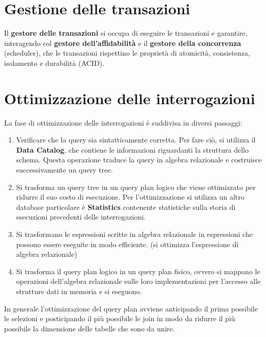 \section{Gestione delle transazioni}
Il \textbf{gestore delle transazioni} si occupa di eseguire le transazioni e
garantire, interagendo col \textbf{gestore dell'affidabilità} e il \textbf{gestore
      della concorrenza} (scheduler), che le transazioni rispettino le proprietà
di atomicità, consistenza, isolamento e durabilità (ACID).
\section{Ottimizzazione delle interrogazioni}
La fase di ottimizzazione delle interrogazioni è suddivisa in diversi passaggi:
\begin{enumerate}
      \item Verificare che la query sia sintatticamente corretta. Per fare ciò,
            si utilizza il \textbf{Data Catalog}, che contiene le informazioni
            riguardanti la struttura dello schema.
            Questa operazione traduce la query in algebra relazionale e costruisce
            successivamente un query tree.
      \item Si trasforma un query tree in un query plan logico che viene ottimizzato
            per ridurre il suo costo di esecuzione. Per l'ottimizzazione si
            utilizza un altro database particolare è \textbf{Statistics}
            contenente statistiche sulla storia di esecuzioni precedenti delle
            interrogazioni.
      \item Si trasformano le espressioni scritte in algebra relazionale in
            espressioni che possono essere eseguite in modo efficiente. (si
            ottimizza l'espressione di algebra relazionale)
      \item Si trasforma il query plan logico in un query plan fisico, ovvero
            si mappano le operazioni dell'algebra relazionale sulle loro
            implementazioni per l'accesso alle strutture dati in memoria e si eseguono.
\end{enumerate}
\begin{nota}
      In generale l'ottimizzazione del query plan avviene anticipando il prima possibile
      le selezioni e posticipando il più possibile le join in modo da ridurre il più
      possibile la dimensione delle tabelle che sono da unire.
\end{nota}
